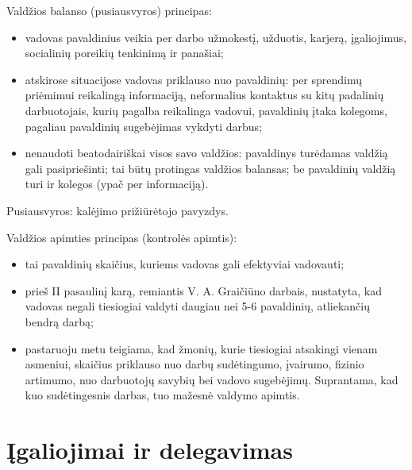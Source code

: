 Valdžios balanso (pusiausvyros) principas:
\begin{itemize}
  \item vadovas pavaldinius veikia per darbo užmokestį, užduotis, karjerą,
    įgaliojimus, socialinių poreikių tenkinimą ir panašiai;
  \item atskirose situacijose vadovas priklauso nuo pavaldinių: per
    sprendimų priėmimui reikalingą informaciją, neformalius kontaktus
    su kitų padalinių darbuotojais, kurių pagalba reikalinga vadovui,
    pavaldinių įtaka kolegoms, pagaliau pavaldinių sugebėjimas vykdyti
    darbus;
  \item nenaudoti beatodairiškai visos savo valdžios: pavaldinys
    turėdamas valdžią gali pasipriešinti; tai būtų protingas valdžios
    balansas; be pavaldinių valdžią turi ir kolegos (ypač per informaciją).
\end{itemize}

Pusiausvyros: kalėjimo prižiūrėtojo pavyzdys.

Valdžios apimties principas (kontrolės apimtis):
\begin{itemize}
  \item tai pavaldinių skaičius, kuriems vadovas gali efektyviai vadovauti;
  \item prieš II pasaulinį karą, remiantis V. A. Graičiūno darbais,
    nustatyta, kad vadovas negali tiesiogiai valdyti daugiau nei
    5-6 pavaldinių, atliekančių bendrą darbą;
  \item pastaruoju metu teigiama, kad žmonių, kurie tiesiogiai atsakingi
    vienam asmeniui, skaičius priklauso nuo darbų sudėtingumo, įvairumo,
    fizinio artimumo, nuo darbuotojų savybių bei vadovo sugebėjimų.
    Suprantama, kad kuo sudėtingesnis darbas, tuo mažesnė valdymo
    apimtis.
\end{itemize}

\section{Įgaliojimai ir delegavimas}


